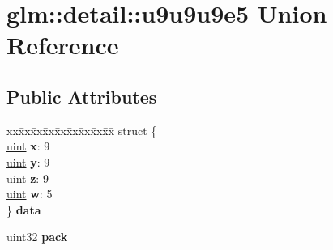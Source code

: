 \hypertarget{unionglm_1_1detail_1_1u9u9u9e5}{}\section{glm\+:\+:detail\+:\+:u9u9u9e5 Union Reference}
\label{unionglm_1_1detail_1_1u9u9u9e5}
\subsection*{Public Attributes}
\begin{DoxyCompactItemize}
\item 
\mbox{\label{unionglm_1_1detail_1_1u9u9u9e5_aec3cfb9113fe5fda39fef08bf4b46a72}} 
\begin{tabbing}
xx\=xx\=xx\=xx\=xx\=xx\=xx\=xx\=xx\=\kill
struct \{\\
\mbox{\label{unionglm_1_1detail_1_1u9u9u9e5_aca9e68f87ba51762beefed6d1079b7e9}} 
\hyperlink{group__core__precision_ga4fd29415871152bfb5abd588334147c8}{uint} {\bfseries x}: 9\\
\mbox{\label{unionglm_1_1detail_1_1u9u9u9e5_ac18d3ec026b08fef2be24cd0e591df32}} 
\hyperlink{group__core__precision_ga4fd29415871152bfb5abd588334147c8}{uint} {\bfseries y}: 9\\
\mbox{\label{unionglm_1_1detail_1_1u9u9u9e5_a3373b74f3dd03f67d07ddb613bd34992}} 
\hyperlink{group__core__precision_ga4fd29415871152bfb5abd588334147c8}{uint} {\bfseries z}: 9\\
\mbox{\label{unionglm_1_1detail_1_1u9u9u9e5_a72bbdee8dc8036f0a199f8a0bf3cec2b}} 
\hyperlink{group__core__precision_ga4fd29415871152bfb5abd588334147c8}{uint} {\bfseries w}: 5\\
\} {\bfseries data}\\

\end{tabbing}\item 
\mbox{\label{unionglm_1_1detail_1_1u9u9u9e5_a76c0b28299b57da27b9e023091ae9c32}} 
uint32 {\bfseries pack}
\end{DoxyCompactItemize}



